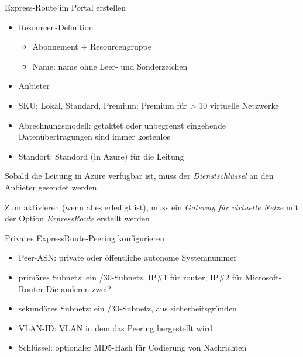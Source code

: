 \begin{flashcard}[Definition]{Express-Route im Portal erstellen}
    \begin{itemize}
        \item Resourcen-Definition
            \begin{itemize}
                \item Abonnement + Resourcengruppe
                \item Name: name ohne Leer- und Sonderzeichen
            \end{itemize}
        \item Anbieter
        \item SKU: Lokal, Standard, Premium: Premium für > 10 virtuelle Netzwerke
        \item Abrechnungsmodell: getaktet oder unbegrenzt\newline
            eingehende Datenübertragungen sind immer kostenlos
        \item Standort: Standord (in Azure) für die Leitung
    \end{itemize}
    Sobald die Leitung in Azure verfügbar ist, muss der \emph{Dienstschlüssel} an den Anbieter gesendet werden

    \vspace{1cm}
    Zum aktivieren (wenn alles erledigt ist), muss ein \emph{Gateway für virtuelle Netze} mit der Option \emph{ExpressRoute} erstellt werden
\end{flashcard}

\begin{flashcard}[Definition]{Privates ExpressRoute-Peering konfigurieren}
    \begin{itemize}
        \item Peer-ASN: private oder öffentliche autonome Systemnummer
        \item primäres Subnetz: ein /30-Subnetz, IP\#1 für router, IP\#2 für Microsoft-Router\newline
            Die anderen zwei?
        \item sekundäres Subnetz: ein /30-Subnetz, aus sicherheitsgründen
        \item VLAN-ID: VLAN in dem das Peering hergestellt wird
        \item Schlüssel: optionaler MD5-Hash für Codierung von Nachrichten
    \end{itemize}
\end{flashcard}

